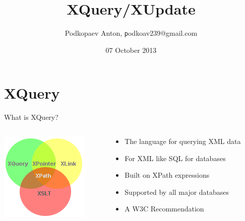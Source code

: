 \documentclass[sans]{beamer}
\begin{document}
\title[XQuery/XUpdate]{XQuery/XUpdate}


\author
[Podkopaev Anton]{Podkopaev Anton, \texttt podkoav239@gmail.com}
\date [07-10-13]{07 October 2013}

\begin{frame}[plain]
	\titlepage
\end{frame}

\section{XQuery}

\begin{frame}{What is XQuery?}
	\begin{columns}
		\begin{column}{0.4\linewidth}
			\includegraphics[width = \linewidth]{images/xpath.png}
		\end{column}

		\begin{column}{0.5\linewidth}
			\begin{itemize}
				\item The language for querying XML data
				\item For XML like SQL for databases
				\item Built on XPath expressions
				\item Supported by all major databases
				\item A W3C Recommendation
			\end{itemize}
		\end{column}
	\end{columns}
\end{frame}
\end{document}
